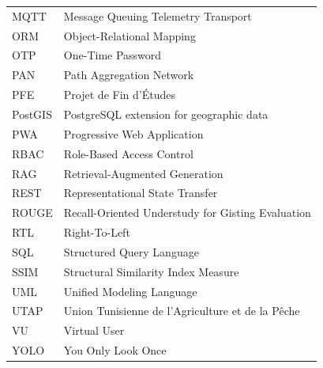 {\begin{tabular}{lp{10cm}}
MQTT & Message Queuing Telemetry Transport \\
ORM & Object-Relational Mapping \\
OTP & One-Time Password \\
PAN & Path Aggregation Network \\
PFE & Projet de Fin d'Études \\
PostGIS & PostgreSQL extension for geographic data \\
PWA & Progressive Web Application \\
RBAC & Role-Based Access Control \\
RAG & Retrieval-Augmented Generation \\
REST & Representational State Transfer \\
ROUGE & Recall-Oriented Understudy for Gisting Evaluation \\
RTL & Right-To-Left \\
SQL & Structured Query Language \\
SSIM & Structural Similarity Index Measure \\
UML & Unified Modeling Language \\
UTAP & Union Tunisienne de l'Agriculture et de la Pêche \\
VU & Virtual User \\
YOLO & You Only Look Once \\
\bottomrule
\end{tabular}%
}
